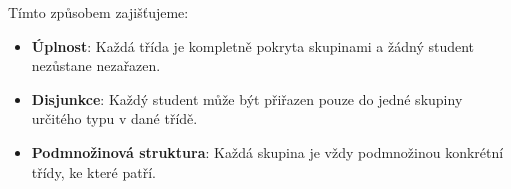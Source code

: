 Tímto způsobem zajišťujeme:

\begin{itemize}
    \item \textbf{Úplnost}: Každá třída je kompletně pokryta skupinami a žádný student nezůstane nezařazen.
    \item \textbf{Disjunkce}: Každý student může být přiřazen pouze do jedné skupiny určitého typu v dané třídě.
    \item \textbf{Podmnožinová struktura}: Každá skupina je vždy podmnožinou konkrétní třídy, ke které patří.
\end{itemize}